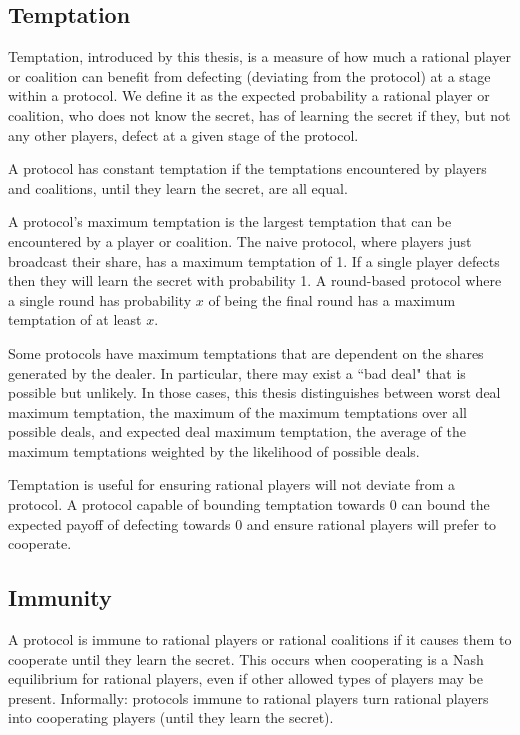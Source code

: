 \documentclass{dalcsthesis}
\begin{document}
\subsection{Temptation}

Temptation, introduced by this thesis, is a measure of how much a rational player or coalition can benefit from defecting (deviating from the protocol) at a stage within a protocol. We define it as the expected probability a rational player or coalition, who does not know the secret, has of learning the secret if they, but not any other players, defect at a given stage of the protocol.

A protocol has constant temptation if the temptations encountered by players and coalitions, until they learn the secret, are all equal.

A protocol's maximum temptation is the largest temptation that can be encountered by a player or coalition. The naive protocol, where players just broadcast their share, has a maximum temptation of 1. If a single player defects then they will learn the secret with probability 1. A round-based protocol where a single round has probability $x$ of being the final round has a maximum temptation of at least $x$.

Some protocols have maximum temptations that are dependent on the shares generated by the dealer. In particular, there may exist a ``bad deal" that is possible but unlikely. In those cases, this thesis distinguishes between worst deal maximum temptation, the maximum of the maximum temptations over all possible deals, and expected deal maximum temptation, the average of the maximum temptations weighted by the likelihood of possible deals.

Temptation is useful for ensuring rational players will not deviate from a protocol. A protocol capable of bounding temptation towards 0 can bound the expected payoff of defecting towards 0 and ensure rational players will prefer to cooperate.

\subsection {Immunity}
\label{Def:Immunity}

A protocol is immune to rational players or rational coalitions if it causes them to cooperate until they learn the secret. This occurs when cooperating is a Nash equilibrium for rational players, even if other allowed types of players may be present. Informally: protocols immune to rational players turn rational players into cooperating players (until they learn the secret).
\end{document}
